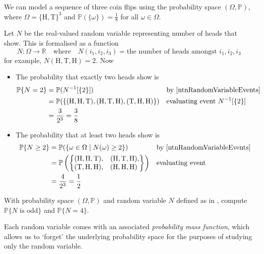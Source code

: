 \begin{example}
\label{exThreeCoinFlips}
We can model a sequence of three coin flips using the probability space $(\Omega,\mathbb{P})$, where $\Omega = \{ \text{H}, \text{T} \}^3$ and $\mathbb{P}(\{\omega\}) = \frac{1}{8}$ for all $\omega \in \Omega$.

Let $N$ be the real-valued random variable representing number of heads that show. This is formalised as a function
\[ N : \Omega \to \mathbb{R} \quad \text{where} \quad N(i_1,i_2,i_3) = \text{the number of heads amongst } i_1,i_2,i_3 \]
for example, $N(\text{H},\text{T},\text{H}) = 2$. Now
\begin{itemize}
\item The probability that exactly two heads show is
\begin{align*}
\mathbb{P}\{N=2\} &= \mathbb{P}(N^{-1}[ \{ 2 \} ]) && \text{by \Cref{ntnRandomVariableEvents}} \\
&= \mathbb{P}(\{ (\text{H},\text{H},\text{T}), (\text{H},\text{T},\text{H}), (\text{T},\text{H},\text{H}) \}) && \text{evaluating event $N^{-1}[ \{ 2 \} ]$} \\
&= \frac{3}{2^3} = \frac{3}{8} &&
\end{align*}
\item The probability that at least two heads show is
\begin{align*}
\mathbb{P}\{N \ge 2\} &= \mathbb{P}(\{ \omega \in \Omega \mid N(\omega) \ge 2 \}) && \text{by \Cref{ntnRandomVariableEvents}} \\
&= \mathbb{P}\left( \begin{Bmatrix} (\text{H},\text{H},\text{T}), & (\text{H},\text{T},\text{H}), \\ (\text{T},\text{H},\text{H}), & (\text{H},\text{H},\text{H})\phantom{,} \end{Bmatrix} \right) && \text{evaluating event} \\
&= \frac{4}{2^3} = \frac{1}{2} && 
\end{align*}
\end{itemize}
\end{example}

\begin{exercise}
With probability space $(\Omega,\mathbb{P})$ and random variable $N$ defined as in , compute $\mathbb{P}\{N \text{ is odd}\}$ and $\mathbb{P}\{N = 4\}$.
\end{exercise}

Each random variable comes with an associated \textit{probability mass function}, which allows us to `forget' the underlying probability space for the purposes of studying only the random variable.

